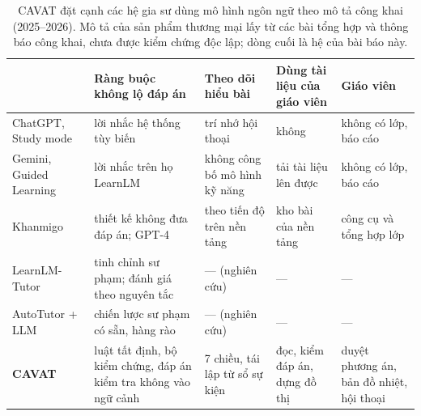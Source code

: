 \begin{table}[tp]
\centering
\caption{CAVAT đặt cạnh các hệ gia sư dùng mô hình ngôn ngữ theo mô tả công khai (2025--2026). Mô tả của sản phẩm thương mại lấy từ các bài tổng hợp và thông báo công khai, chưa được kiểm chứng độc lập; dòng cuối là hệ của bài báo này.}
\label{tab:positioning}
\small
\begin{tabularx}{\linewidth}{@{}>{\raggedright\arraybackslash}p{2.6cm}YYYY@{}}
\toprule
 & Ràng buộc không lộ đáp án & Theo dõi hiểu bài & Dùng tài liệu của giáo viên & Giáo viên \\
\midrule
ChatGPT, Study mode~\cite{studymode} & lời nhắc hệ thống tùy biến & trí nhớ hội thoại & không & không có lớp, báo cáo \\
Gemini, Guided Learning~\cite{guidedlearning} & lời nhắc trên họ LearnLM & không công bố mô hình kỹ năng & tải tài liệu lên được & không có lớp, báo cáo \\
Khanmigo~\cite{khanmigo} & thiết kế không đưa đáp án; GPT-4 & theo tiến độ trên nền tảng & kho bài của nền tảng & công cụ và tổng hợp lớp \\
LearnLM-Tutor~\cite{jurenka2024} & tinh chỉnh sư phạm; đánh giá theo nguyên tắc & --- (nghiên cứu) & --- & --- \\
AutoTutor + LLM~\cite{chowdhury2024} & chiến lược sư phạm có sẵn, hàng rào & --- (nghiên cứu) & --- & --- \\
\textbf{CAVAT} & luật tất định, bộ kiểm chứng, đáp án kiểm tra không vào ngữ cảnh & 7 chiều, tái lập từ sổ sự kiện & đọc, kiểm đáp án, dựng đồ thị & duyệt phương án, bản đồ nhiệt, hội thoại \\
\bottomrule
\end{tabularx}
\end{table}
